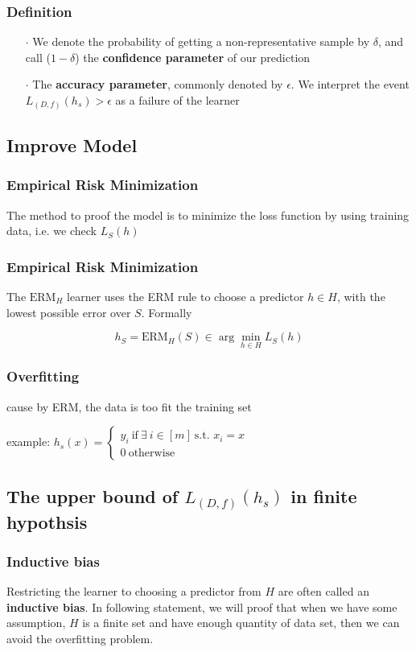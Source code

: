 \begin{frame}
	\frametitle{Definition}
	\begin{enumerate}
		\item[$\cdot$] We denote the probability of getting a non-representative sample by $\delta$, and call ($1 - \delta$) the \textbf{confidence parameter} of our prediction
		\item[$\cdot$] The \textbf{accuracy parameter}, commonly denoted by $\epsilon$. We interpret the event $L_{(D,f)}(h_s) > \epsilon$ as a failure of the learner
	\end{enumerate}
	
\end{frame}

\begin{frame}
	\section{Improve Model}
	\frametitle{Empirical Risk Minimization}
	
	The method to proof the model is to minimize the loss function by using training data, i.e. we check $L_S(h)$
	
\end{frame}

\begin{frame}
	\frametitle{Empirical Risk Minimization}
	The $\text{ERM}_H$ learner uses the ERM rule to choose a predictor $h \in H$, with the lowest possible error over $S$. Formally

$$h_S = \text{ERM}_H(S) \in \arg\min_{h \in H}L_S(h)$$
	
\end{frame}

\begin{frame}
	\frametitle{Overfitting}
	cause by ERM, the data is too fit the training set

example: $h_s(x) = \begin{cases}
	y_i~\text{if}~\exists~i \in [m]~\text{s.t. } x_i = x\\
	0~\text{otherwise}
\end{cases}$
	
\end{frame}


\begin{frame}
	\section{The upper bound of $L_{(D,f)}(h_s)$ in finite hypothsis}
	\frametitle{Inductive bias}
	Restricting the learner to choosing a predictor from $H$ are often called an \textbf{inductive bias}. In following statement, we will proof that when we have some assumption, $H$ is a finite set and have enough quantity of data set, then we can avoid the overfitting problem.
	
	
\end{frame}


